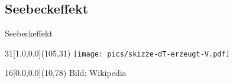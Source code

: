 \subsection[Seebeck]{Seebeckeffekt}

\begin{frame}{Seebeckeffekt}%
\begin{textblock}{31}[1.0,0.0](105,31)
\texttt{[image: pics/skizze-dT-erzeugt-V.pdf]}
\end{textblock}
\begin{textblock}{16}[0.0,0.0](10,78)
\tiny Bild: Wikipedia
\end{textblock}

\end{frame}


